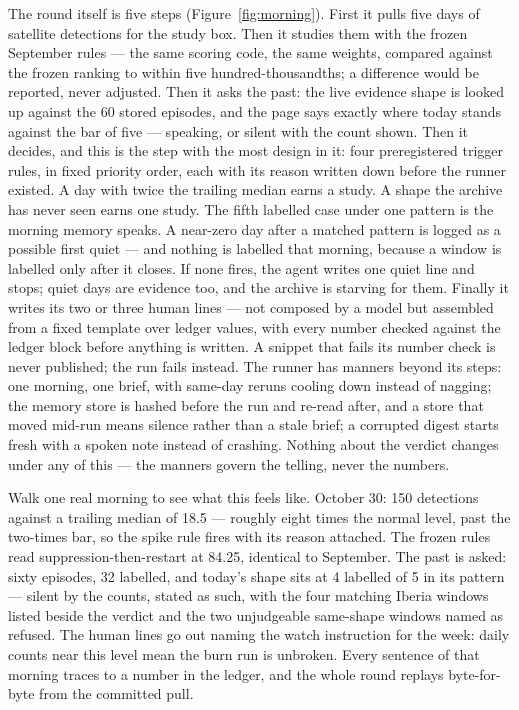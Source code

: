 \documentclass[11pt]{article}
\begin{document}
The round itself is five steps (Figure~\ref{fig:morning}). First it pulls
five days of satellite detections for the study box. Then it studies them
with the frozen September rules — the same scoring code, the same weights,
compared against the frozen ranking to within five hundred-thousandths; a
difference would be reported, never adjusted. Then it asks the past: the
live evidence shape is looked up against the 60 stored episodes, and the
page says exactly where today stands against the bar of five — speaking, or
silent with the count shown. Then it decides, and this is the step with the
most design in it: four preregistered trigger rules, in fixed priority
order, each with its reason written down before the runner existed. A day
with twice the trailing median earns a study. A shape the archive has never
seen earns one study. The fifth labelled case under one pattern is the
morning memory speaks. A near-zero day after a matched pattern is logged as
a possible first quiet — and nothing is labelled that morning, because a
window is labelled only after it closes. If none fires, the agent writes one
quiet line and stops; quiet days are evidence too, and the archive is
starving for them. Finally it writes its two or three human lines — not
composed by a model but assembled from a fixed template over ledger values,
with every number checked against the ledger block before anything is
written. A snippet that fails its number check is never published; the run
fails instead. The runner has manners beyond its steps: one morning, one
brief, with same-day reruns cooling down instead of nagging; the memory store
is hashed before the run and re-read after, and a store that moved mid-run
means silence rather than a stale brief; a corrupted digest starts fresh with
a spoken note instead of crashing. Nothing about the verdict changes under any
of this --- the manners govern the telling, never the numbers.

Walk one real morning to see what this feels like. October 30: 150
detections against a trailing median of 18.5 — roughly eight times the
normal level, past the two-times bar, so the spike rule fires with its
reason attached. The frozen rules read suppression-then-restart at 84.25,
identical to September. The past is asked: sixty episodes, 32 labelled, and
today's shape sits at 4 labelled of 5 in its pattern — silent by the counts,
stated as such, with the four matching Iberia windows listed beside the
verdict and the two unjudgeable same-shape windows named as refused. The
human lines go out naming the watch
instruction for the week: daily counts near this level mean the burn run is
unbroken. Every sentence of that morning traces to a number in the ledger,
and the whole round replays byte-for-byte from the committed pull.
\end{document}
